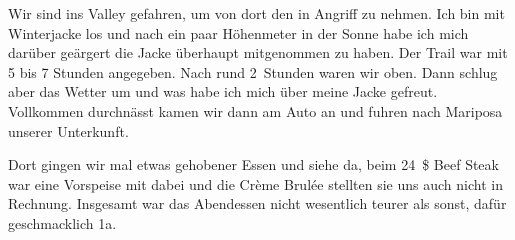 Wir sind ins Valley gefahren, um von dort den  in Angriff zu nehmen.
Ich bin mit Winterjacke los und nach ein paar Höhenmeter in der Sonne habe ich mich darüber geärgert die Jacke überhaupt mitgenommen zu haben.
Der Trail war mit 5 bis 7 Stunden angegeben.
Nach rund 2~Stunden waren wir oben.
Dann schlug aber das Wetter um und was habe ich mich über meine Jacke gefreut.
Vollkommen durchnässt kamen wir dann am Auto an und fuhren nach Mariposa unserer Unterkunft.


Dort gingen wir mal etwas gehobener Essen und siehe da, beim 24~\$ Beef Steak war eine Vorspeise mit dabei und die Crème Brulée stellten sie uns auch nicht in Rechnung.
Insgesamt war das Abendessen nicht wesentlich teurer als sonst, dafür geschmacklich 1a.

\newpage
\thispagestyle{empty}
\newpage
